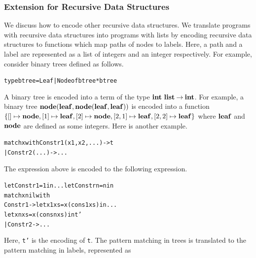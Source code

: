 


\subsubsection{Extension for Recursive Data Structures}
We discuss how to encode other recursive data structures.  We
translate programs with recursive data structures into programs with
lists by encoding recursive data structures to functions which map paths
of nodes to labels.  Here, a path and a label are represented as a list
of integers and an integer respectively.  For example, consider binary trees defined
as follows.
\vspace{-5pt}
\begin{alltt}
 type btree = Leaf | Node of btree * btree
\end{alltt}
\vspace{-5pt}
A binary tree is encoded into a term of the type
${{\mathbf{int}}\ \mathbf{list}}\mathbin{\rightarrow}{\mathbf{int}}$.  For example, a binary tree
$\mathbf{node}({\mathbf{leaf}},{\mathbf{node}({\mathbf{leaf}},{\mathbf{leaf}})})$ is encoded into a function $\{[]
\mapsto \mathbf{node}, [1] \mapsto \mathbf{leaf}, [2] \mapsto \mathbf{node}, [2,1] \mapsto
\mathbf{leaf}, [2,2] \mapsto \mathbf{leaf}\}$ where $\mathbf{leaf}$ and $\mathbf{node}$ are defined as
some integers.
Here is another example.
\vspace{-5pt}
\begin{alltt}
 match x with Constr1(x1, x2, ...) -> t
            | Constr2(...) -> ...
\end{alltt}
\vspace{-5pt}
The expression above is encoded to the following expression.
\vspace{-5pt}
\begin{alltt}
 let Constr1 = 1 in ... let Constrn = n in
   match x nil with
       Constr1 -> let x1 xs = x (cons 1 xs) in ...
                  let xn xs = x (cons n xs) in t'
     | Constr2 -> ...
\end{alltt}
\vspace{-5pt}
Here, \texttt{t'} is the encoding of \texttt{t}. The pattern matching in
trees is translated to the pattern matching in labels, represented as
